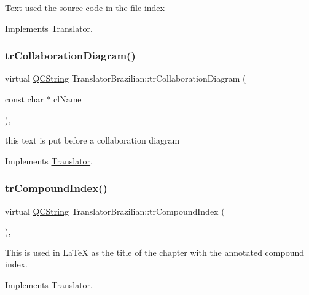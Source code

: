 Text used the source code in the file index 

Implements \mbox{\hyperlink{class_translator}{Translator}}.

\mbox{\label{class_translator_brazilian_a4890c2b0299690e661ba09cc37efd30f}} 
\subsubsection{\texorpdfstring{trCollaborationDiagram()}{trCollaborationDiagram()}}
{\footnotesize\ttfamily virtual \mbox{\hyperlink{class_q_c_string}{Q\+C\+String}} Translator\+Brazilian\+::tr\+Collaboration\+Diagram (\begin{DoxyParamCaption}\item[{const char $\ast$}]{cl\+Name }\end{DoxyParamCaption})\hspace{0.3cm}{\ttfamily [inline]}, {\ttfamily [virtual]}}

this text is put before a collaboration diagram 

Implements \mbox{\hyperlink{class_translator}{Translator}}.

\mbox{\label{class_translator_brazilian_a3e27e3f53914d0352a3fc991f9cafdc0}} 
\subsubsection{\texorpdfstring{trCompoundIndex()}{trCompoundIndex()}}
{\footnotesize\ttfamily virtual \mbox{\hyperlink{class_q_c_string}{Q\+C\+String}} Translator\+Brazilian\+::tr\+Compound\+Index (\begin{DoxyParamCaption}{ }\end{DoxyParamCaption})\hspace{0.3cm}{\ttfamily [inline]}, {\ttfamily [virtual]}}

This is used in La\+TeX as the title of the chapter with the annotated compound index. 

Implements \mbox{\hyperlink{class_translator}{Translator}}.

